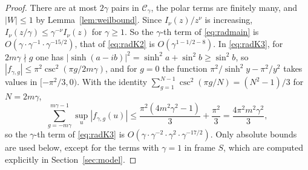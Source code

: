 \begin{proof}
There are at most $2\gamma$ pairs in $\mathcal C_\gamma$, the polar terms are finitely many, and $|W|\le1$ by Lemma~\ref{lem:weilbound}. Since $I_\nu(z)/z^\nu$ is increasing, $I_\nu(z/\gamma)\le\gamma^{-\nu}I_\nu(z)$ for $\gamma\ge1$. So the $\gamma$-th term of \eqref{eq:radmain} is $O(\gamma\cdot\gamma^{-1}\cdot\gamma^{-15/2})$, that of \eqref{eq:radK2} is $O(\gamma^{1-1/2-8})$. In \eqref{eq:radK3}, for $2m\gamma\nmid g$ one has $|\sinh(a-ib)|^2=\sinh^2a+\sin^2b\ge\sin^2b$, so $|f_{\gamma,g}|\le\pi^2\csc^2(\pi g/2m\gamma)$, and for $g=0$ the function $\pi^2/\sinh^2y-\pi^2/y^2$ takes values in $[-\pi^2/3,0)$. With the identity $\sum_{g=1}^{N-1}\csc^2(\pi g/N)=(N^2-1)/3$ for $N=2m\gamma$,
\begin{equation}\label{eq:fsum}
\sum_{g=-m\gamma}^{m\gamma-1}\sup_u|f_{\gamma,g}(u)|\le\frac{\pi^2(4m^2\gamma^2-1)}3+\frac{\pi^2}3=\frac{4\pi^2m^2\gamma^2}3,
\end{equation}
so the $\gamma$-th term of \eqref{eq:radK3} is $O(\gamma\cdot\gamma^{-2}\cdot\gamma^2\cdot\gamma^{-17/2})$. Only absolute bounds are used below, except for the terms with $\gamma=1$ in frame $S$, which are computed explicitly in Section~\ref{sec:model}.
\end{proof}

